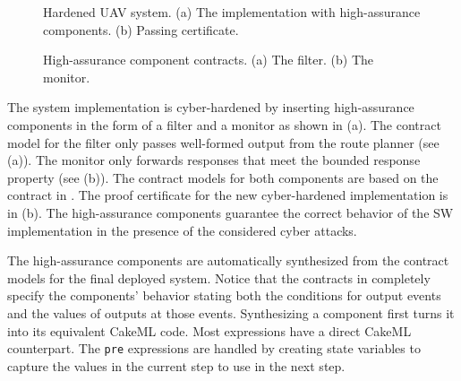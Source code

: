 \begin{figure*}
  \caption{Hardened UAV system. (a) The implementation with high-assurance components. (b) Passing certificate.}
  \label{fig:hardened}
\end{figure*}

\begin{figure}
  \caption{High-assurance component contracts. (a) The filter. (b) The monitor.}
  \label{fig:assurance}
\end{figure}

The system implementation is cyber-hardened by inserting high-assurance components in the form of a filter and a monitor as shown in (a). The contract model for the filter only passes well-formed output from the route planner (see (a)). The monitor only forwards responses that meet the bounded response property (see (b)). The contract models for both components are based on the contract in . The proof certificate for the new cyber-hardened implementation is in (b). The high-assurance components guarantee the correct behavior of the SW implementation in the presence of the considered cyber attacks.

The high-assurance components are automatically synthesized from the contract models for the final deployed system. Notice that the contracts in  completely specify the components' behavior stating both the conditions for output events and the values of outputs at those events. Synthesizing a component first turns it into its equivalent CakeML code.
Most expressions have a direct CakeML counterpart. The \texttt{pre} expressions are handled by creating state variables to capture the values in the current step to use in the next step. 
